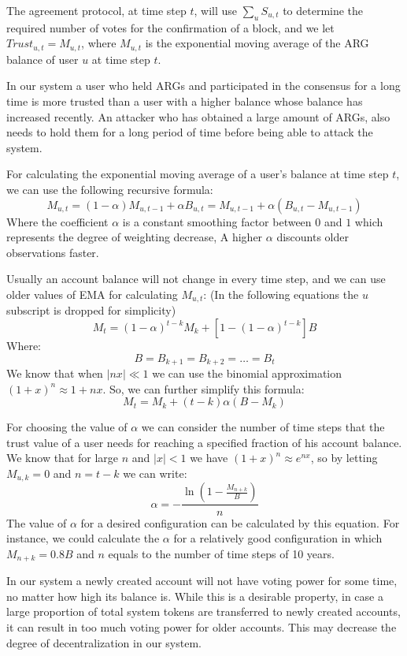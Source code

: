 \documentclass[a4paper]{report}
\begin{document}
    The agreement protocol, at time step \(t\), will use \(\sum_{u}S_{u,t}\) to determine the required
    number of votes for the confirmation of a block, and we let \(Trust_{u,t} = M_{u,t}\), where \(M_{u,t}\) is the
    exponential moving average of the ARG balance of user \(u\) at time step \(t\).

    In our system a user who held ARGs and participated in the consensus for a long time is more trusted
    than a user with a higher balance whose balance has increased recently. An attacker who has obtained a large
    amount of ARGs, also needs to hold them for a long period of time before being able to attack the system.

    For calculating the exponential moving average of a user's balance at time step \(t\), we can use the following
    recursive formula:
    \[
        M_{u,t} = (1 - \alpha) M_{u,t-1} + \alpha B_{u,t} = M_{u,t-1} + \alpha (B_{u,t} - M_{u,t-1})
    \]
    Where the coefficient \(\alpha\) is a constant smoothing factor between \(0\) and \(1\) which represents the
    degree of weighting decrease, A higher \(\alpha\) discounts older observations faster.

    Usually an account balance will not change in every time step, and we can use older values of EMA for calculating
    \(M_{u,t}\): (In the following equations the \(u\) subscript is dropped for simplicity)
    \[
        M_{t} = (1 - \alpha)^{t-k}M_{k} + [1 - (1 - \alpha)^{t - k}]B
    \]
    Where:
    \[
        B = B_{k+1} = B_{k+2} = \dots = B_{t}
    \]
    We know that when \(|nx| \ll 1\) we can use the binomial approximation \({(1 + x)^n \approx 1 + nx}\). So, we can
    further simplify this formula:
    \[
        M_{t} = M_{k} + (t - k) \alpha (B - M_{k})
    \]

    For choosing the value of \(\alpha\) we can consider the number of time steps that the trust value of a user needs
    for reaching a specified fraction of his account balance. We know that for large \(n\) and \(|x| < 1\) we have
    \((1 + x)^n \approx e^{nx}\), so by letting \(M_{u,k} = 0\) and \(n = t - k\) we can write:
    \[
        \alpha =- \frac{\ln\left(1 - \frac{M_{n+k}}{B}\right)}{n}
    \]
    The value of \(\alpha\) for a desired configuration can be calculated by this equation. For instance, we could
    calculate the \(\alpha\) for a relatively good configuration in which \(M_{n+k} = 0.8B\) and \(n\) equals to the
    number of time steps of 10 years.

    In our system a newly created account will not have voting power for some time, no matter how high its
    balance is. While this is a desirable property, in case a large proportion of total system tokens are
    transferred to newly created accounts, it can result in too much voting power for older accounts. This may decrease
    the degree of decentralization in our system.
\end{document}
